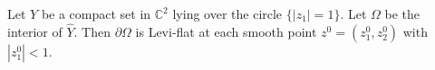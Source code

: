 
Let $Y$ be a compact set in $\mathbb{C}^2$ lying over the circle $\{|z_1| = 1\}$. Let $\Omega$ be the interior of $\hat{Y}$. Then $\partial \Omega$ is Levi-flat at each smooth point $z^0 = (z_1^0, z_2^0)$ with $|z_1^0| < 1$.

